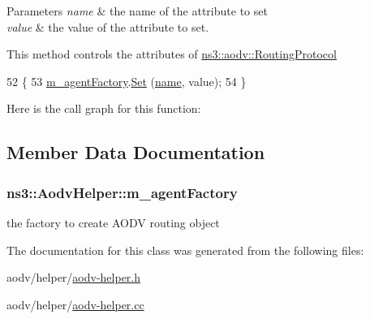 \begin{DoxyParams}{Parameters}
{\em name} & the name of the attribute to set \\
\hline
{\em value} & the value of the attribute to set.\\
\hline
\end{DoxyParams}
This method controls the attributes of \hyperlink{classns3_1_1aodv_1_1RoutingProtocol}{ns3\+::aodv\+::\+Routing\+Protocol} 
\begin{DoxyCode}
52 \{
53   \hyperlink{classns3_1_1AodvHelper_abfdf876d75cce594ac15de780c3fd46c}{m\_agentFactory}.\hyperlink{classns3_1_1ObjectFactory_aef5c0d5019c96bdf01cefd1ff83f4a68}{Set} (\hyperlink{generate__test__data__lte__spectrum__model_8m_ab74e6bf80237ddc4109968cedc58c151}{name}, value);
54 \}
\end{DoxyCode}


Here is the call graph for this function\+:




\subsection{Member Data Documentation}
\subsubsection[{\texorpdfstring{m\+\_\+agent\+Factory}{m_agentFactory}}]{ ns3\+::\+Aodv\+Helper\+::m\+\_\+agent\+Factory\hspace{0.3cm}{\ttfamily [private]}}\hypertarget{classns3_1_1AodvHelper_abfdf876d75cce594ac15de780c3fd46c}{}\label{classns3_1_1AodvHelper_abfdf876d75cce594ac15de780c3fd46c}
the factory to create A\+O\+DV routing object 

The documentation for this class was generated from the following files\+:\begin{DoxyCompactItemize}
\item 
aodv/helper/\hyperlink{aodv-helper_8h}{aodv-\/helper.\+h}\item 
aodv/helper/\hyperlink{aodv-helper_8cc}{aodv-\/helper.\+cc}\end{DoxyCompactItemize}
